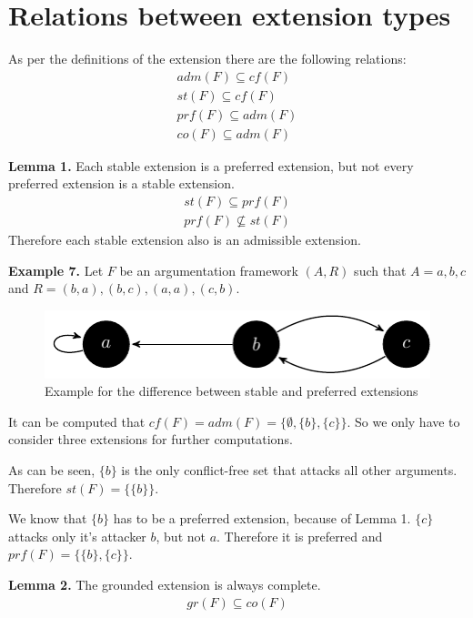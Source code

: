 \documentclass[draft,final]{vutinfth} %
\newcommand{\hl}{\par\vspace{6pt}} %
\newcommand{\cl}{\par\vspace{12pt}} %
\begin{document}
\section{Relations between extension types}

As per the definitions of the extension there are the following relations:
\begin{align} %
	adm(F)\subseteq cf(F)\\
	st(F)\subseteq cf(F)\\
	prf(F)\subseteq adm(F)\\
	co(F)\subseteq adm(F)
\end{align}\cl

\textbf{Lemma 1.}
Each stable extension is a preferred extension, but not every preferred extension is a stable extension.\\
\begin{align}
	st(F)\subseteq prf(F)\\
	prf(F)\not\subseteq st(F)
\end{align}
Therefore each stable extension also is an admissible extension.\cl

\textbf{Example 7.} Let $F$ be an argumentation framework $(A,R)$ such that $A={a,b,c}$ and $R={(b,a),(b,c),(a,a),(c,b)}$.

\FloatBarrier
	\begin{figure}[!htb]
		\centering
		\includegraphics[width=\linewidth]{graphs/ex2_v2.pdf}
		\caption{Example for the difference between stable and preferred extensions}
	\end{figure}
\FloatBarrier

It can be computed that $cf(F)=adm(F)=\{\emptyset,\{b\},\{c\}\}$. So we only have to consider three extensions for further computations.\hl
As can be seen, $\{b\}$ is the only conflict-free set that attacks all other arguments. Therefore $st(F)=\{\{b\}\}$.\hl
We know that $\{b\}$ has to be a preferred extension, because of Lemma 1. $\{c\}$ attacks only it's attacker $b$, but not $a$. Therefore it is preferred and $prf(F)=\{\{b\},\{c\}\}$.\cl

\textbf{Lemma 2.} %
The grounded extension is always complete. %
\begin{align}
	gr(F)\subseteq co(F)
\end{align}
\end{document}
